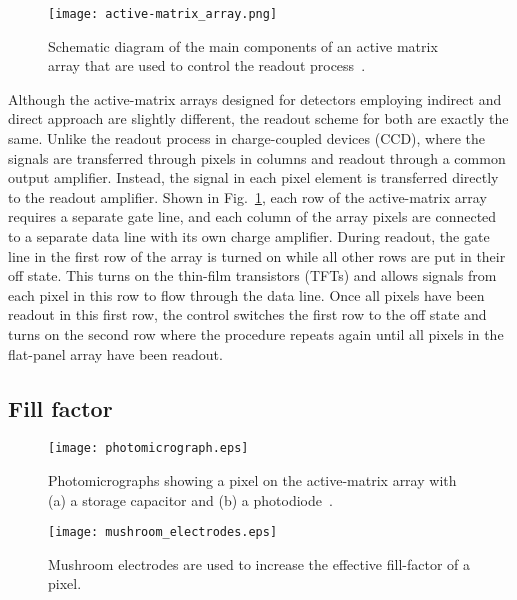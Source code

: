 \begin{figure}[ht]
\texttt{[image: active-matrix\_array.png]}
\caption{Schematic diagram of the main components of an active matrix array that are used to control the readout process~\citep{Fahrig2008}.}
\label{fig:schematic_active-matrix_array}
\end{figure}

Although the active-matrix arrays designed for detectors employing indirect and direct approach are slightly different, the readout scheme for both are exactly the same.  Unlike the readout process in charge-coupled devices (CCD), where the signals are transferred through pixels in columns and readout through a common output amplifier.  Instead, the signal in each pixel element is transferred directly to the readout amplifier.  Shown in Fig.~\ref{fig:schematic_active-matrix_array}, each row of the active-matrix array requires a separate gate line, and each column of the array pixels are connected to a separate data line with its own charge amplifier.  During readout, the gate line in the first row of the array is turned on while all other rows are put in their off state.  This turns on the thin-film transistors (TFTs) and allows signals from each pixel in this row to flow through the data line.  Once all pixels have been readout in this first row, the control switches the first row to the off state and turns on the second row where the procedure repeats again until all pixels in the flat-panel array have been readout.  

\subsection{Fill factor}
%
\begin{figure}[ht]
\texttt{[image: photomicrograph.eps]}
\caption{Photomicrographs showing a pixel on the active-matrix array with (a) a storage capacitor and (b) a photodiode~\citep{Rowlands2000}.}
\label{fig:pixel_fill_factor}
\end{figure}
%
\begin{figure}[ht]
\texttt{[image: mushroom\_electrodes.eps]}
\caption{Mushroom electrodes are used to increase the effective fill-factor of a pixel.}
\label{fig:mushroom_electrodes}
\end{figure}

